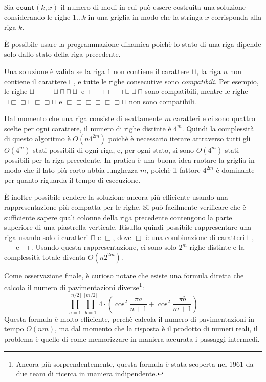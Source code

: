 Sia $\texttt{count}(k,x)$ il numero di modi in cui può essere
costruita una soluzione considerando le righe $1 \ldots k$
in una griglia in modo che la stringa $x$ corrisponda alla riga $k$.

È possibile usare la programmazione dinamica poichè
lo stato di una riga dipende solo dallo stato della riga precedente.

Una soluzione è valida se la riga $1$ non contiene il carattere $\sqcup$,
la riga $n$ non contiene il carattere $\sqcap$,
e tutte le righe consecutive sono \emph{compatibili}.
Per esempio, le righe
$\sqcup \sqsubset \sqsupset \sqcup \sqcap \sqcap \sqcup$ e
$\sqsubset \sqsupset \sqsubset \sqsupset \sqcup \sqcup \sqcap$ 
sono compatibili, mentre le righe
$\sqcap \sqsubset \sqsupset \sqcap \sqsubset \sqsupset \sqcap$ e
$\sqsubset \sqsupset \sqsubset \sqsupset \sqsubset \sqsupset \sqcup$
non sono compatibili.

Dal momento che una riga consiste di esattamente $m$ caratteri 
e ci sono quattro scelte per ogni carattere, il numero di
righe distinte è $4^m$.
Quindi la complessità di questo algoritmo è
$O(n 4^{2m})$ poichè è necessario iterare attraverso tutti gli
$O(4^m)$ stati possibili di ogni riga, e, per ogni stato,
si sono $O(4^m)$ stati possibili per la riga precedente.
In pratica è una buona idea ruotare la griglia in modo 
che il lato più corto abbia lunghezza $m$,
poichè il fattore $4^{2m}$ è dominante per quanto riguarda il tempo di esecuzione.

È inoltre possibile rendere la soluzione ancora più efficiente
usando una rappresentazione più compatta per le righe.
Si può facilmente verificare che è sufficiente sapere
quali colonne della riga precedente contengono la parte superiore
di una piastrella verticale.
Risulta quindi possibile rappresentare una riga usando solo i caratteri
$\sqcap$ e $\Box$, dove $\Box$ è una combinazione di caratteri
$\sqcup$, $\sqsubset$ e $\sqsupset$.
Usando questa rappresentazione, ci sono solo
$2^m$ righe distinte e la complessità totale diventa 
$O(n 2^{2m})$.

Come osservazione finale, è curioso notare che esiste una formula diretta
che calcola il numero di pavimentazioni diverse\footnote{
Ancora più sorprendentemente, questa formula è stata scoperta nel 1961 da due team di ricerca \cite{kas61,tem61} in maniera 
indipendente.}:
\[ \prod_{a=1}^{\lceil n/2 \rceil} \prod_{b=1}^{\lceil m/2 \rceil} 4 \cdot (\cos^2 \frac{\pi a}{n + 1} + \cos^2 \frac{\pi b}{m+1})\]
Questa formula è molto efficiente, perchè calcola il numero 
di pavimentazioni in tempo $O(nm)$,
ma dal momento che la risposta è il prodotto di numeri reali,
il problema è quello di come memorizzare in maniera
accurata i passaggi intermedi.
